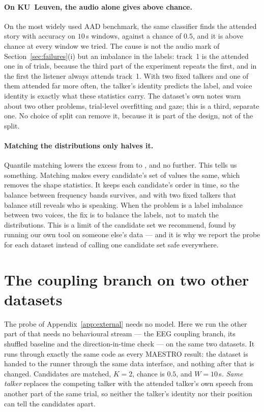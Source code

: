 \paragraph{On KU~Leuven, the audio alone gives  above chance.}
On the most widely used AAD benchmark, the same classifier finds the attended
story with accuracy  on $10$\,s windows, against a
chance of $0.5$, and it is above chance at every window we tried. The cause is
not the audio mark of Section~\ref{sec:failures}(i) but an imbalance in the
labels: track~1 is the attended one in  of
 trials, because the third part of the experiment repeats
the first, and in the first the listener always attends track~1. With two fixed
talkers and one of them attended far more often, the talker's identity
predicts the label, and voice identity is exactly what these statistics carry.
The dataset's own notes warn about two other problems, trial-level overfitting
and gaze; this is a third, separate one. No choice of split can remove it, because
it is part of the design, not of the split.

\paragraph{Matching the distributions only halves it.}
Quantile matching lowers the excess from  to
, and no further. This tells us something. Matching
makes every candidate's set of values the same, which removes the shape
statistics. It keeps each candidate's order in time, so the balance between
frequency bands survives, and with two fixed talkers that balance still reveals
who is speaking. When the problem is a label imbalance between two voices, the
fix is to balance the labels, not to match the distributions. This is a limit of
the candidate set we recommend, found by running our own tool on someone else's
data --- and it is why we report the probe for each dataset instead of calling
one candidate set safe everywhere.

\section{The coupling branch on two other datasets}
\label{app:externalcoupling}

The probe of Appendix~\ref{app:external} needs no model. Here we run the other
part of \merit{} that needs no behavioural stream --- the EEG coupling branch,
its shuffled baseline and the direction-in-time check --- on the same two
datasets. It runs through exactly the same code as every MAESTRO result: the
dataset is handed to the runner through the same data interface, and nothing
after that is changed. Candidates are matched, $K=2$, chance is $0.5$, and
$W=10$\,s. \emph{Same talker} replaces the competing talker with the attended
talker's own speech from another part of the same trial, so neither the talker's
identity nor their position can tell the candidates apart.

